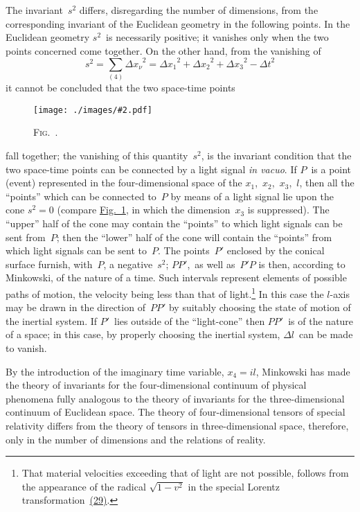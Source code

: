 \documentclass[12pt]{book}[2005/09/16]
\newcounter{figno}
\newcommand{\Figure}[2][0.75\textwidth]{%
\begin{figure}[hbt!]
  \refstepcounter{figno}
  \centering
  \texttt{[image: ./images/\#2.pdf]}
  \caption{\textsc{Fig}.~\thefigno.}
  \label{fig:\thefigno}
\end{figure}
}
\newcommand{\PageSep}[1]{\ignorespaces}
\newcommand{\Eqref}[1]{\hyperref[eqn:#1]{#1}}
\newcommand{\Figref}[1]{\hyperref[fig:#1]{Fig.~#1}}
\begin{document}
The invariant~$s^{2}$ differs, disregarding the number of
dimensions, from the corresponding invariant of the
Euclidean geometry in the following points. In the
Euclidean geometry $s^{2}$~is necessarily positive; it vanishes
\PageSep{41}
only when the two points concerned come together. On
the other hand, from the vanishing of
\[
s^{2} = \sum_{(4)} {\Delta x_{\nu}}^{2}
  = {\Delta x_{1}}^{2} + {\Delta x_{2}}^{2} + {\Delta x_{3}}^{2} - {\Delta t}^{2}
\]
it cannot be concluded that the two space-time points
\Figure{041}
fall together; the vanishing of this quantity~$s^{2}$, is the
invariant condition that the two space-time points can be
connected by a light signal \textit{in vacuo}. If $P$~is a point
\PageSep{42}
(event) represented in the four-dimensional space of the
$x_{1}$,~$x_{2}$,~$x_{3}$,~$l$, then all the ``points'' which can be connected
to~$P$ by means of a light signal lie upon the cone $s^{2} = 0$
(compare \Figref{1}, in which the dimension~$x_{3}$ is suppressed).
The ``upper'' half of the cone may contain the ``points''
to which light signals can be sent from~$P$; then the
``lower'' half of the cone will contain the ``points'' from
which light signals can be sent to~$P$. The points~$P'$
enclosed by the conical surface furnish, with~$P$, a negative~$s^{2}$;
$PP'$,~as well as~$P'P$ is then, according to Minkowski,
of the nature of a time. Such intervals represent elements
of possible paths of motion, the velocity being less than
that of light.\footnote
  {That material velocities exceeding that of light are not possible,
  follows from the appearance of the radical $\sqrt{1 - v^{2}}$ in the special Lorentz
  transformation~\Eqref{(29)}.}
In this case the $l$-axis may be drawn in
the direction of~$PP'$ by suitably choosing the state of
motion of the inertial system. If $P'$~lies outside of the
``light-cone'' then $PP'$~is of the nature of a space; in
%
this case, by properly choosing the inertial system, $\Delta l$~can
be made to vanish.

By the introduction of the imaginary time variable,
$x_{4} = il$, Minkowski has made the theory of invariants for
the four-dimensional continuum of physical phenomena
fully analogous to the theory of invariants for the three-dimensional
continuum of Euclidean space. The theory
of four-dimensional tensors of special relativity differs from
the theory of tensors in three-dimensional space, therefore,
only in the number of dimensions and the relations of
reality.
\PageSep{43}
\end{document}
